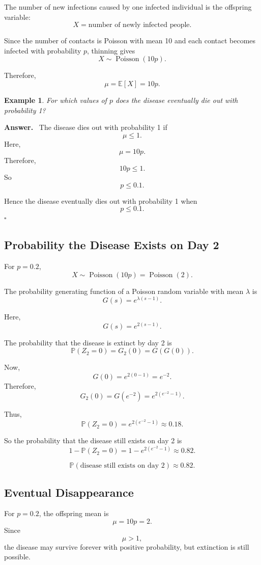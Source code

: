 \documentclass[12pt,a4paper]{article}
\theoremstyle{lecturestyle}
\newtheorem{example}{Example}
\newenvironment{answer}
{\par\textbf{Answer.}\ }
{\hfill$\square$\par}
\newcommand{\Prob}{\mathbb{P}}
\newcommand{\E}{\mathbb{E}}
\begin{document}
The number of new infections caused by one infected individual is the offspring variable:
\[
X=\text{number of newly infected people}.
\]

Since the number of contacts is Poisson with mean 10 and each contact becomes infected with probability $p$, thinning gives
\[
X\sim \operatorname{Poisson}(10p).
\]

Therefore,
\[
\mu=\E[X]=10p.
\]

\begin{example}
For which values of $p$ does the disease eventually die out with probability 1?
\end{example}

\begin{answer}
The disease dies out with probability 1 if
\[
\mu\leq 1.
\]
Here,
\[
\mu=10p.
\]
Therefore,
\[
10p\leq 1.
\]
So
\[
p\leq 0.1.
\]

Hence the disease eventually dies out with probability 1 when
\[
\boxed{p\leq 0.1.}
\]
\end{answer}

\subsection{Probability the Disease Exists on Day 2}

For $p=0.2$,
\[
X\sim \operatorname{Poisson}(10p)=\operatorname{Poisson}(2).
\]

The probability generating function of a Poisson random variable with mean $\lambda$ is
\[
G(s)=e^{\lambda(s-1)}.
\]

Here,
\[
G(s)=e^{2(s-1)}.
\]

The probability that the disease is extinct by day 2 is
\[
\Prob(Z_2=0)=G_2(0)=G(G(0)).
\]

Now,
\[
G(0)=e^{2(0-1)}=e^{-2}.
\]
Therefore,
\[
G_2(0)=G(e^{-2})
=
e^{2(e^{-2}-1)}.
\]

Thus,
\[
\Prob(Z_2=0)=e^{2(e^{-2}-1)}\approx 0.18.
\]

So the probability that the disease still exists on day 2 is
\[
1-\Prob(Z_2=0)
=
1-e^{2(e^{-2}-1)}
\approx 0.82.
\]

\[
\boxed{\Prob(\text{disease still exists on day 2})\approx 0.82.}
\]

\subsection{Eventual Disappearance}

For $p=0.2$, the offspring mean is
\[
\mu=10p=2.
\]
Since
\[
\mu>1,
\]
the disease may survive forever with positive probability, but extinction is still possible.
\end{document}

